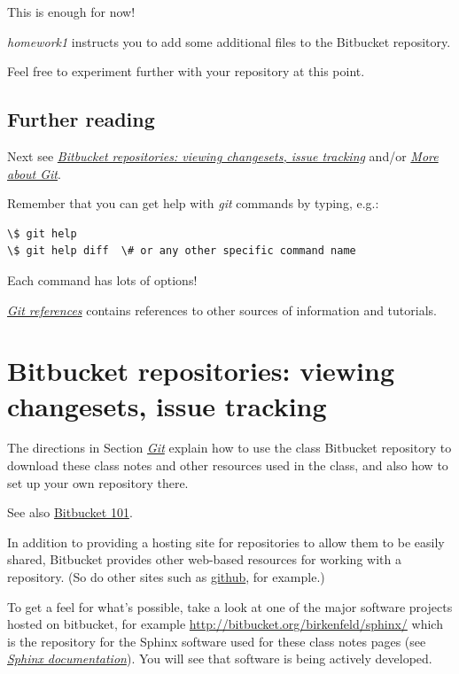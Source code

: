 \documentclass[letterpaper,10pt,english]{sphinxmanual}
\begin{document}
This is enough for now!

\emph{homework1} instructs you to add some additional files to the Bitbucket
repository.

Feel free to experiment further with your repository at this point.


\subsection{Further reading}
\label{git:further-reading}
Next see {\hyperref[bitbucket:bitbucket]{\emph{Bitbucket repositories: viewing changesets, issue tracking}}} and/or {\hyperref[git_more:git-more]{\emph{More about Git}}}.

Remember that you can get help with \emph{git} commands by typing, e.g.:

\begin{Verbatim}[commandchars=\\\{\}]
\$ git help
\$ git help diff  \# or any other specific command name
\end{Verbatim}

Each command has lots of options!

{\hyperref[biblio:biblio-git]{\emph{Git references}}} contains references to other sources of information and
tutorials.


\section{Bitbucket repositories: viewing changesets, issue tracking}
\label{bitbucket:bitbucket-repositories-viewing-changesets-issue-tracking}\label{bitbucket:bitbucket}\label{bitbucket::doc}
The directions in Section {\hyperref[git:git]{\emph{Git}}} explain how to use the class Bitbucket
repository to download these class notes and other resources used in the
class, and also how to set up your own repository there.

See also \href{https://confluence.atlassian.com/display/BITBUCKET/Bitbucket+101}{Bitbucket 101}.

In addition to providing a hosting site for repositories to allow them to be
easily shared, Bitbucket provides other web-based resources for working with
a repository.  (So do other sites such as
\href{http://github.com/repositories}{github}, for
example.)

To get a feel for what's possible, take a look at one of the major software
projects hosted on bitbucket, for example
\href{http://bitbucket.org/birkenfeld/sphinx/}{http://bitbucket.org/birkenfeld/sphinx/} which is the repository for the
Sphinx software used for these class notes pages (see {\hyperref[sphinx:sphinx]{\emph{Sphinx documentation}}}).  You
will see that software is being actively developed.
\end{document}
